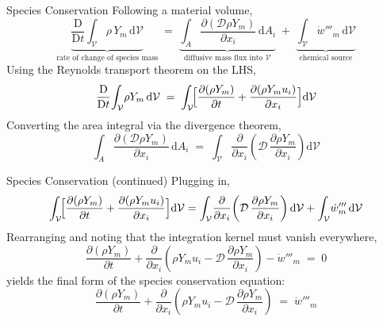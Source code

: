 \documentclass[10pt,aspectratio=43]{beamer}
\newcommand{\dd}{\mathrm{d}}
\newcommand{\D}{\mathrm{D}}
\newcommand{\pd}[2]{\frac{\partial #1}{\partial #2}}
\newcommand{\Vol}{\mathcal{V}}
\begin{document}
\begin{frame}{Species Conservation}
  Following a material volume,
  \[
    \underbrace{\frac{\D}{\D t}\!\int_{\Vol}\!\rho\,Y_{m}\,\dd\Vol}_{\text{rate of change of species mass}}
      \;=\; \underbrace{\int_{A}\!\frac{\partial(\mathcal{D}\rho Y_{m})}{\partial x_{i}}\,\dd A_{i}}_{\text{diffusive mass flux into }\Vol}
        \;+\; \underbrace{\int_{\Vol}\!\dot{w}'''_{m}\,\dd\Vol}_{\text{chemical source}}
  \]
  Using the Reynolds transport theorem on the LHS,
  \[
    \frac{\D}{\D t}\!\int_{\Vol}\!\rho Y_{m}\,\dd\Vol
      \;=\; \int_{\Vol}\!\Bigl[\pd{(\rho Y_{m})}{t} + \pd{(\rho Y_{m}u_{i})}{x_{i}}\Bigr]\dd\Vol
  \]
  Converting the area integral via the divergence theorem,
  \[
    \int_{A}\!\frac{\partial(\mathcal{D}\rho Y_{m})}{\partial x_{i}}\,\dd A_{i}
      \;=\; \int_{\Vol}\!\frac{\partial}{\partial x_{i}}\!\left(\mathcal{D}\,\pd{\rho Y_{m}}{x_{i}}\right)\dd\Vol
  \]
\end{frame}

\begin{frame}{Species Conservation (continued)}
  Plugging in,
  \[
    \int_{\Vol}\!\Bigl[\pd{(\rho Y_{m})}{t} + \pd{(\rho Y_{m}u_{i})}{x_{i}}\Bigr]\dd\Vol
      = \int_{\Vol}\!\frac{\partial}{\partial x_{i}}\!\left(\mathcal{D}\,\pd{\rho Y_{m}}{x_{i}}\right)\dd\Vol
        + \int_{\Vol}\!\dot{w}'''_{m}\,\dd\Vol
  \]
  Rearranging and noting that the integration kernel must vanish everywhere,
  \[
    \pd{(\rho Y_{m})}{t} + \pd{}{x_{i}}\!\left(\rho Y_{m}u_{i} - \mathcal{D}\,\pd{\rho Y_{m}}{x_{i}}\right) - \dot{w}'''_{m} \;=\; 0
  \]
  yields the final form of the species conservation equation:
  \[
    \boxed{\;\pd{(\rho Y_{m})}{t} + \pd{}{x_{i}}\!\left(\rho Y_{m}u_{i} - \mathcal{D}\,\pd{\rho Y_{m}}{x_{i}}\right) \;=\; \dot{w}'''_{m}\;}
  \]
\end{frame}
\end{document}
